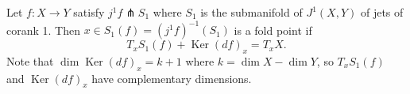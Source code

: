 Let $f: X \to Y$ satisfy $j^1 f \pitchfork S_1$ where $S_1$ is the submanifold of $J^1(X, Y)$ of jets of corank 1. Then $x \in S_1(f) = (j^1 f)^{-1}(S_1)$ is a fold point if
$$T_x S_1(f) + \operatorname{Ker}(df)_x = T_x X.$$
Note that $\dim \operatorname{Ker}(df)_x = k+1$ where $k = \dim X - \dim Y$, so $T_x S_1(f)$ and $\operatorname{Ker}(df)_x$ have complementary dimensions.
